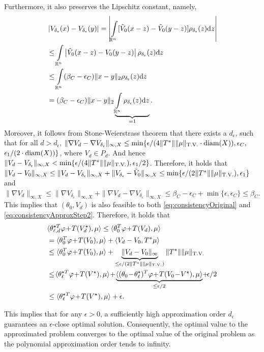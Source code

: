 \begin{pf}
    Furthermore, it also preserves the Lipschitz constant, namely,
    \begin{align*}
    &\left|V_{\delta_\epsilon}(x)-V_{\delta_\epsilon}(y)\right| = \left|\int_{\mR^n}[\tilde{V}_0(x-z)-\tilde V_0(y-z)]\rho_{\delta_\epsilon}(z)\mathrm dz\right|\\
    &\le\int_{\mR^n}\left|\tilde{V}_0(x-z)-V_0(y-z)\right|\rho_{\delta_\epsilon}(z)\mathrm dz\\
    &\le\int_{\mR^n}(\beta_C-\epsilon_C)\|x-y\|_2\rho_{\delta_\epsilon}(z)\mathrm dz\\
    &=(\beta_C-\epsilon_C)\|x-y\|_2\underbrace{\int_{\mR^n}\rho_{\delta_\epsilon}(z)\mathrm dz}_{=1}.
    \end{align*}
    Moreover,
    it follows from Stone-Weierstrass theorem that there exists a $d_\epsilon$, such that for all $d>d_\epsilon$, $\|\nabla V_d-\nabla V_{\delta_\epsilon}\|_{\infty,X}\le\min\{\epsilon/(4\|T^*\|\|\mu\|_{\operatorname*{T.V.}}\cdot\operatorname*{diam}(X)),\epsilon_C,$ $\epsilon_1/(2\cdot\operatorname*{diam}(X))\}$, where $V_d\in P_d$. 
And hence $\|V_d-V_{\delta_\epsilon}\|_{\infty,X}<\min\{\epsilon/(4\|T^*\|\|\mu\|_{\operatorname*{T.V.}}),\epsilon_1/2\}$.     
    Therefore, it holds that $\|V_d- V_{0}\|_{\infty,X}\le\|V_d-V_{\delta_\epsilon}\|_{\infty,X}+\|V_{\delta_\epsilon}-\tilde V_{0}\|_{\infty,X} \le\min\{\epsilon/(2\|T^*\|\|\mu\|_{\operatorname*{T.V.}}),\epsilon_1\}$ and $\|\nabla V_d\|_{\infty,X}\le \|\nabla V_{\delta_\epsilon}\|_{\infty,X}+\|\nabla V_d-\nabla V_{\delta_\epsilon}\|_{\infty,X}\le \beta_C-\epsilon_C+\min\{\epsilon,\epsilon_C\}\le\beta_C$.
    This implies that $(\theta_0,V_d)$ is also feasible to both \eqref{eq:consistencyOriginal} and \eqref{eq:consistencyApproxStep2}.
    Therefore, it holds that
    \begin{equation*}
        \begin{aligned}
            &\langle\theta_{\ell, d}^{\star T}\varphi \!+\! T(V_d^\star),\mu \rangle \leq \langle\theta_0^{T}\varphi \!+\! T(V_d),\mu \rangle\\
            &= \langle\theta_0^{T}\varphi \!+\! T(V_0),\mu \rangle + \langle V_d-V_0, T^*\mu\rangle\\
            &\le  \langle\theta_0^{T}\varphi \!+\! T(V_0),\mu \rangle + \underbrace{\|V_d-V_0\|_\infty}_{\le \epsilon/(2\|T^*\|\|\mu\|_{\tv})}\|T^*\|\|\mu\|_{\tv}\\
            &\leq\! \langle\theta_{\ell}^{\star T}\varphi \!+\! T(V^\star),\mu \rangle \!+\! \underbrace{\langle (\theta_0 \!-\! \theta_\ell^\star)^T\varphi \!+\! T(V_0\!-\!V^\star), \mu \rangle}_{\le \epsilon/2} \!+\! \epsilon/2\\
            &\leq \langle\theta_{\ell}^{\star T}\varphi \!+\! T(V^\star),\mu \rangle + \epsilon.
        \end{aligned}
     \end{equation*}
    

    This implies that for any $\epsilon>0$, a sufficiently high approximation order $d_\epsilon$ guarantees an $\epsilon$-close optimal solution. Consequently, the optimal value to the approximated problem converges to the optimal value of the original problem as the polynomial approximation order tends to infinity.
\end{pf}

